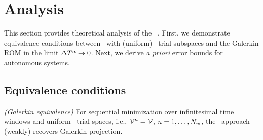 \section{Analysis}\label{sec:analysis}
This section provides theoretical analysis of the \methodAcronym\ \approachKwd. First, we demonstrate equivalence conditions 
between \methodAcronym\  with (uniform) \spatialAcronym\ trial subspaces and
the Galerkin ROM in the limit $\Delta T^{n} \rightarrow 0$.
Next, we derive \textit{a priori} error bounds for autonomous systems. 
\subsection{Equivalence conditions}
\begin{theorem}\label{theorem:galerkin_equiv}\textit{(Galerkin equivalence)}
For sequential minimization over infinitesimal time windows and uniform
	\spatialAcronym\ trial spaces, i.e., $\mathcal{V }^{n} = \mathcal{V }$,
	$n=1,\ldots,N_w$, the \methodAcronym\ approach (weakly) recovers
	Galerkin projection.
\end{theorem}
